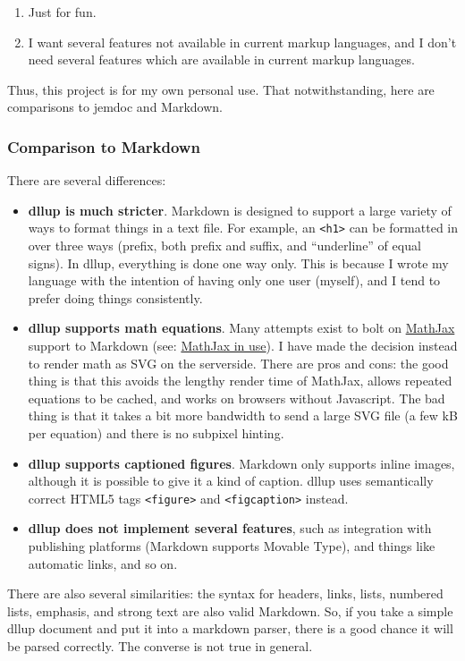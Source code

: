 \begin{enumerate}
\item Just for fun.
\item I want several features not available in current markup languages, and I don't need several features which are available in current markup languages.
\end{enumerate}
Thus, this project is for my own personal use. That notwithstanding, here are comparisons to jemdoc and Markdown.

\subsubsection{Comparison to Markdown}
\label{s1.2.1}
There are several differences:

\begin{itemize}\item \textbf{dllup is much stricter}. Markdown is designed to support a large variety of ways to format things in a text file. For example, an \texttt{<h1>} can be formatted in over three ways (prefix, both prefix and suffix, and ``underline'' of equal signs). In dllup, everything is done one way only. This is because I wrote my language with the intention of having only one user (myself), and I tend to prefer doing things consistently.
\item \textbf{dllup supports math equations}. Many attempts exist to bolt on \href{http://www.mathjax.org}{MathJax} support to Markdown (see: \href{http://docs.mathjax.org/en/latest/misc/mathjax-in-use.html}{MathJax in use}). I have made the decision instead to render math as SVG on the serverside. 
There are pros and cons: the good thing is that this avoids the lengthy render time of MathJax, allows repeated equations to be cached, and works on browsers without Javascript. The bad thing is that it takes a bit more bandwidth to send a large SVG file (a few kB per equation) and there is no subpixel hinting.
\item \textbf{dllup supports captioned figures}. Markdown only supports inline images, although it is possible to give it a kind of caption. dllup uses semantically correct HTML5 tags \texttt{<figure>} and \texttt{<figcaption>} instead.
\item \textbf{dllup does not implement several features}, such as integration with publishing platforms (Markdown supports Movable Type), and things like automatic links, and so on.
\end{itemize}
There are also several similarities: the syntax for headers, links, lists, numbered lists, emphasis, and strong text are also valid Markdown. So, if you take a simple dllup document and put it into a markdown parser, there is a good chance it will be parsed correctly. The converse is not true in general.

